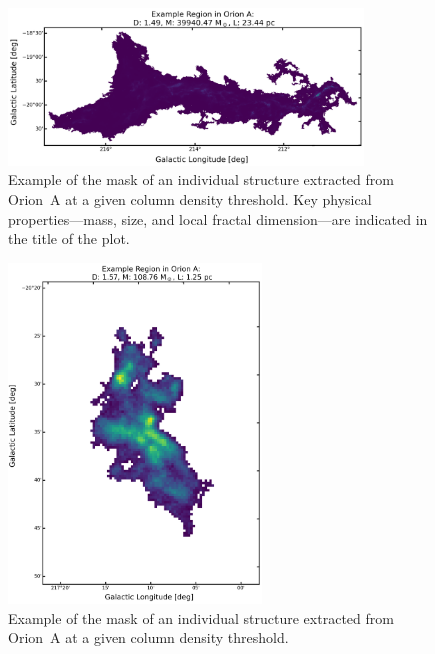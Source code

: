 \begin{figure}[h]
    \centering
    \includegraphics[width=0.84\textwidth]{figures/MSD_Gallery_Orion_A_1.png}
    \caption{Example of the mask of an individual structure extracted from Orion~A at a given column density threshold. Key physical properties—mass, size, and local fractal dimension—are indicated in the title of the plot.}
    \label{fig:gallery_MSD_A_1}
\end{figure}

\begin{figure}[h]
    \centering
    \includegraphics[width=0.6\textwidth]{figures/MSD_Gallery_Orion_A_2.png}
    \caption{Example of the mask of an individual structure extracted from Orion~A at a given column density threshold.}
    \label{fig:gallery_MSD_A_2}
\end{figure}

